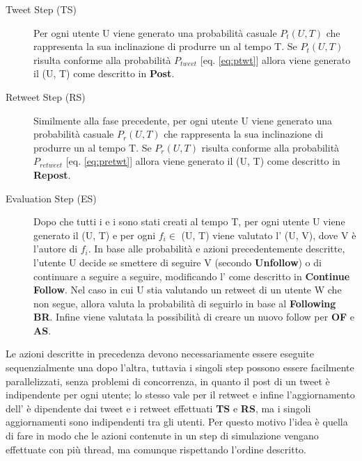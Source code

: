 \begin{description}
  \item[Tweet Step (TS)] Per ogni utente U viene generato una 
  probabilit\`a casuale $P_t(U,T)$ che rappresenta la sua 
  inclinazione di produrre un \twt{} al tempo T. Se $P_t(U,T)$
  risulta conforme  alla probabilit\`a $P_{tweet}$ [eq. \ref{eq:ptwt}] allora
  viene generato il \twt{}(U, T) come descritto in \textbf{Post}.
  
  \item[Retweet Step (RS)] Similmente alla fase precedente,
  per ogni utente U viene generato una 
  probabilit\`a casuale $P_r(U,T)$ che rappresenta la sua 
  inclinazione di produrre un \retwt{} al tempo T. Se $P_r(U,T)$
  risulta conforme  alla probabilit\`a $P_{retweet}$ [eq. \ref{eq:pretwt}] 
  allora viene generato il \retwt{}(U, T) come descritto in 
  \textbf{Repost}.
  
  \item[Evaluation Step (ES)] Dopo che tutti i \twt{} e i \retwt{}
  sono stati creati al tempo T, per ogni utente U viene generato
  il \FOV{}(U, T) e per ogni $f_i \in$ \FOV{}(U, T) viene valutato 
  l' \attach{}(U, V), dove V \`e l'autore di $f_i$. In base alle 
  probabilit\`a e azioni precedentemente descritte, l'utente U decide
  se smettere di seguire V (secondo \textbf{Unfollow}) o di
  continuare a seguire a seguire, modificando l'\attach{} come
  descritto in \textbf{Continue Follow}. 
  Nel caso in cui U stia valutando un retweet di un utente W che non 
  segue, allora valuta la probabilit\`a di seguirlo in base al 
  \textbf{Following BR}.
  Infine viene valutata la possibilit\`a di creare un nuovo follow 
  per \textbf{OF} e \textbf{AS}.
\end{description}

Le azioni descritte in precedenza devono necessariamente essere 
eseguite sequenzialmente una dopo l'altra, tuttavia i singoli step 
possono essere facilmente parallelizzati, senza problemi di 
concorrenza, in quanto il post di un tweet \`e indipendente per ogni
utente; lo stesso vale per il retweet e infine l'aggiornamento dell'
\attach{} \`e  dipendente dai tweet e i retweet effettuati 
\textbf{TS} e \textbf{RS}, ma i singoli aggiornamenti sono 
indipendenti tra gli utenti. Per questo motivo l'idea \`e quella di
fare in modo che le azioni contenute in un step di simulazione 
vengano effettuate con pi\`u thread, ma comunque rispettando l'ordine
descritto.
